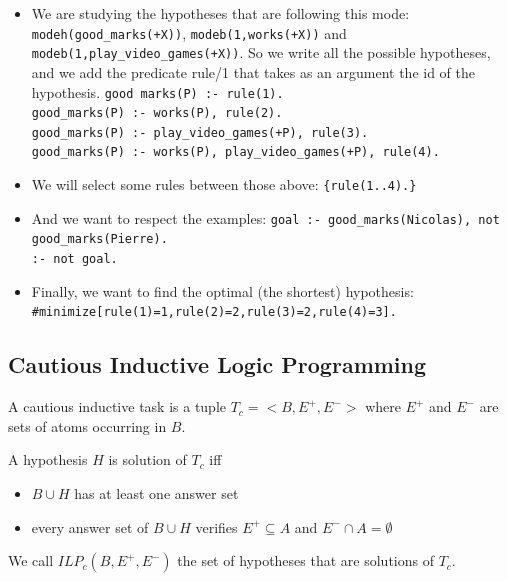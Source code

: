 \begin{itemize}
\item We are studying the hypotheses that are following this mode: \texttt{modeh(good\_marks(+X))}, \texttt{modeb(1,works(+X))} and \texttt{modeb(1,play\_video\_games(+X))}. So we write all the possible hypotheses, and we add the predicate rule/1 that takes as an argument the id of the hypothesis.\newline
\texttt{good marks(P) :- rule(1).\\
good\_marks(P) :- works(P), rule(2).\\
good\_marks(P) :- play\_video\_games(+P), rule(3).\\
good\_marks(P) :- works(P), play\_video\_games(+P), rule(4).}

\item We will select some rules between those above:\newline
\texttt{\{rule(1..4).\}}

\item And we want to respect the examples:\newline
\texttt{goal :- good\_marks(Nicolas), not good\_marks(Pierre).\\
:- not goal.}

\item Finally, we want to find the optimal (the shortest) hypothesis:\newline
\texttt{\#minimize[rule(1)=1,rule(2)=2,rule(3)=2,rule(4)=3].}

\end{itemize}





\subsection{Cautious Inductive Logic Programming}

\begin{definition}

A cautious inductive task is a tuple $T_c=<B, E^+, E^->$ where $E^+$ and $E^-$ are sets of atoms occurring in $B$.

\smallskip

A hypothesis $H$ is solution of $T_c$ iff 
\begin{itemize}
\item $B\cup H$ has at least one answer set
\item every answer set of $B\cup H$ verifies $E^+\subseteq A$ and $E^-\cap A = \emptyset$
\end{itemize}

\smallskip

We call $ILP_c(B,E^+,E^-)$ the set of hypotheses that are solutions of $T_c$. 

\end{definition}


